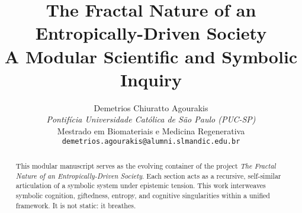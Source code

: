 \documentclass[12pt]{article}
\title{\textbf{The Fractal Nature of an Entropically-Driven Society} \\ \large A Modular Scientific and Symbolic Inquiry}
\author{
Demetrios Chiuratto Agourakis\\
\textit{Pontifícia Universidade Católica de São Paulo (PUC-SP)}\\
Mestrado em Biomateriais e Medicina Regenerativa\\
\texttt{demetrios.agourakis@alumni.slmandic.edu.br}
}
\date{\DTMnow}
\begin{document}
\maketitle

\begin{abstract}
This modular manuscript serves as the evolving container of the project \textit{The Fractal Nature of an Entropically-Driven Society}. Each section acts as a recursive, self-similar articulation of a symbolic system under epistemic tension. This work interweaves symbolic cognition, giftedness, entropy, and cognitive singularities within a unified framework. It is not static: it breathes.
\end{abstract}

\tableofcontents
\newpage


% 
% 
% 
% 
% 



\end{document}
